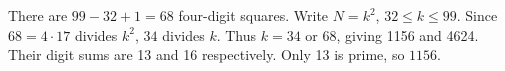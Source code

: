 There are $99-32+1=68$ four-digit squares. Write $N=k^2$, $32\le k\le99$. Since $68=4\cdot17$ divides $k^2$, $34$ divides $k$. Thus $k=34$ or 68, giving 1156 and 4624. Their digit sums are 13 and 16 respectively. Only 13 is prime, so $\boxed{1156}$.
